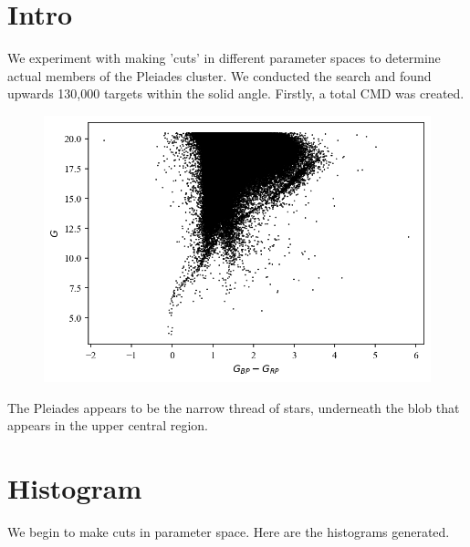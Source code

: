 \documentclass{article}
\begin{document}
\section{Intro}
We experiment with making 'cuts' in different parameter spaces to determine actual members of the Pleiades cluster.    
We conducted the search and found upwards 130,000 targets within the solid angle.
Firstly, a total CMD was created.

\begin{figure}[H]
    \centering
    \includegraphics[scale = .5]{Figure 2025-02-08 230950 (0).png}
\end{figure}

The Pleiades appears to be the narrow thread of stars, underneath the blob that appears in the upper central region.

\section{Histogram}

We begin to make cuts in parameter space. 
Here are the histograms generated.
\end{document}
